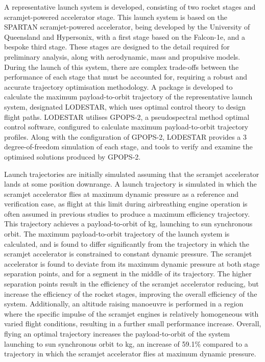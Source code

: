  A representative launch system is developed, consisting of two rocket stages and scramjet-powered accelerator stage.
This launch system is based on the SPARTAN scramjet-powered accelerator, being developed by the University of Queensland and Hypersonix, with a first stage based on the Falcon-1e, and a bespoke third stage. These stages are designed to the detail required for preliminary analysis, along with aerodynamic, mass and propulsive models.
During the launch of this system, there are complex trade-offs between the performance of each stage that must be accounted for, requiring a robust and accurate trajectory optimisation methodology. 
 A package is developed to calculate the maximum payload-to-orbit trajectory of the representative launch system, designated LODESTAR, which uses optimal control theory to design flight paths. LODESTAR utilises GPOPS-2, a pseudospectral method optimal control software, configured to calculate maximum payload-to-orbit trajectory profiles. Along with the configuration of GPOPS-2, LODESTAR provides a 3 degree-of-freedom simulation of each stage, and tools to verify and examine the optimised solutions produced by GPOPS-2.


 
Launch trajectories are initially simulated assuming that the scramjet accelerator lands at some position downrange. A launch trajectory is simulated in which the scramjet accelerator flies at maximum dynamic pressure as a reference and verification case, as flight at this limit during airbreathing engine operation is often assumed in previous studies to produce a maximum efficiency trajectory. This trajectory achieves a payload-to-orbit of \PayloadToOrbitConstqNoReturn kg, launching to sun synchronous orbit.  
The maximum payload-to-orbit trajectory of the launch system is calculated, and is found to differ significantly from the trajectory in which the scramjet accelerator is constrained to constant dynamic pressure. 
 The scramjet accelerator is found to deviate from its maximum dynamic pressure at both stage separation points, and for a segment in the middle of its trajectory.
 The higher separation points result in the efficiency of the scramjet accelerator reducing, but increase the efficiency of the rocket stages, improving the overall efficiency of the system. 
  Additionally, an altitude raising manoeuvre is performed in a region where the specific impulse of the scramjet engines is relatively homogeneous with varied flight conditions, resulting in a further small performance increase. Overall, flying an optimal trajectory increases the payload-to-orbit of the system launching to sun synchronous orbit to \PayloadToOrbitStandardNoReturn kg, an increase of 59.1\% compared to a trajectory in which the scramjet accelerator flies at maximum dynamic pressure.  
 
